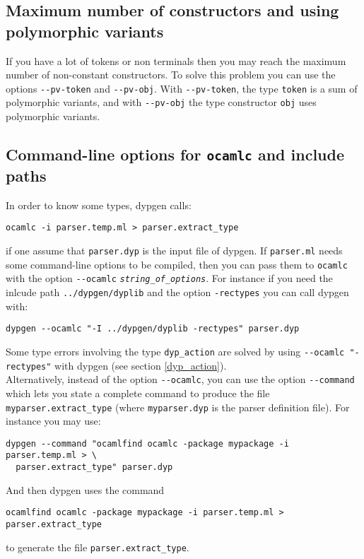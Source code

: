 \documentclass[12pt]{article}
\begin{document}
{\subsection{Maximum number of constructors and using polymorphic variants}\label{--pv-obj}

If you have a lot of tokens or non terminals then you may reach the maximum number of non-constant constructors. To solve this problem you can use the options \verb|--pv-token| and \verb|--pv-obj|. With \verb|--pv-token|, the type \verb|token| is a sum of polymorphic variants, and with \verb|--pv-obj| the type constructor \verb|obj| uses polymorphic variants.

\subsection{Command-line options for \texttt{ocamlc} and include paths}\label{ocamlc}

In order to know some types, dypgen calls:
\begin{verbatim}
ocamlc -i parser.temp.ml > parser.extract_type
\end{verbatim}
if one assume that \verb|parser.dyp| is the input file of dypgen. If \verb|parser.ml| needs some command-line options to be compiled, then you can pass them to \verb|ocamlc| with the option \verb|--ocamlc| \texttt{\emph{string\_of\_options}}. For instance if you need the inlcude path \verb|../dypgen/dyplib| and the option \verb|-rectypes| you can call dypgen with:
\begin{verbatim}
dypgen --ocamlc "-I ../dypgen/dyplib -rectypes" parser.dyp
\end{verbatim}

Some type errors involving the type \verb|dyp_action| are solved by using \verb|--ocamlc "-rectypes"| with dypgen (see section \ref{dyp_action}).\\

Alternatively, instead of the option \verb|--ocamlc|, you can use the option \verb|--command| which lets you state a complete command to produce the file \verb|myparser.extract_type| (where \verb|myparser.dyp| is the parser definition file). For instance you may use:
\begin{verbatim}
dypgen --command "ocamlfind ocamlc -package mypackage -i parser.temp.ml > \
  parser.extract_type" parser.dyp
\end{verbatim}
And then dypgen uses the command
\begin{verbatim}
ocamlfind ocamlc -package mypackage -i parser.temp.ml > parser.extract_type
\end{verbatim}
to generate the file \verb|parser.extract_type|.

}
\end{document}
